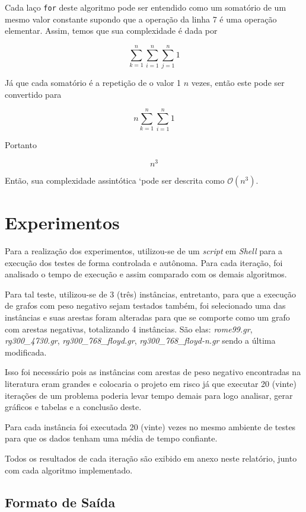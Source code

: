 \documentclass[12pt]{article}
\begin{document}
Cada laço \texttt{for} deste algoritmo pode ser entendido como um somatório de um mesmo valor constante supondo que a operação da linha 7 é uma operação elementar. Assim, temos que sua complexidade é dada por

    $$\sum_{k=1}^{n}\sum_{i=1}^{n}\sum_{j=1}^{n}1$$
    
Já que cada somatório é a repetição de o valor 1 $n$ vezes, então este pode ser convertido para

$$n\sum_{k=1}^{n}\sum_{i=1}^{n}1$$

Portanto

$$n^3$$

Então, sua complexidade assintótica `pode ser descrita como $\mathcal{O}(n^3)$.



\section{Experimentos}

Para a realização dos experimentos, utilizou-se de um \textit{script} em \textit{Shell} para a execução dos testes de forma controlada e autônoma. Para cada iteração, foi analisado o tempo de execução e assim comparado com os demais algoritmos.

Para tal teste, utilizou-se de 3 (três) instâncias, entretanto, para que a execução de grafos com peso negativo sejam testados também, foi selecionado uma das instâncias e suas arestas foram alteradas para que se comporte como um grafo com arestas negativas, totalizando 4 instâncias. São elas: \textit{rome99.gr}, \textit{rg300\_4730.gr}, \textit{rg300\_768\_floyd.gr}, \textit{rg300\_768\_floyd-n.gr} sendo a última modificada.

Isso foi necessário pois as instâncias com arestas de peso negativo encontradas na literatura eram grandes e colocaria o projeto em risco já que executar 20 (vinte) iterações de um problema poderia levar tempo demais para logo analisar, gerar gráficos e tabelas e a conclusão deste.

Para cada instância foi executada 20 (vinte) vezes no mesmo ambiente de testes para que os dados tenham uma média de tempo confiante.

Todos os resultados de cada iteração são exibido em anexo neste relatório, junto com cada algoritmo implementado.



\subsection{Formato de Saída}
\end{document}

